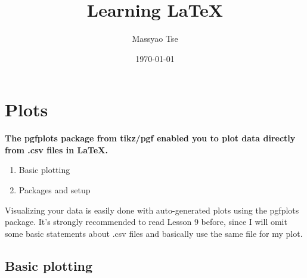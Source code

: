 \documentclass{article}
\begin{document}
\author{Massyao Tse}
\title{Learning \LaTeX{}}
\date{\today{}} %


\maketitle{} %
\newpage

\tableofcontents{} %


% 

% 

% 

% 

% 

% 

% 

% 

% 


\maketitle
\newpage
\section{Plots}
  \textbf{
    The pgfplots package from tikz/pgf enabled you to plot data directly from .csv files in LaTeX.
  }
  \begin{enumerate} %
    \item Basic plotting
    \item Packages and setup
  \end{enumerate} 
  Visualizing your data is easily done with auto-generated plots using the pgfplots package. It's strongly recommended to read Lesson 9 before, since I will omit some basic statements about .csv files and basically use the same file for my plot.

  \subsection{Basic plotting}
\end{document}

